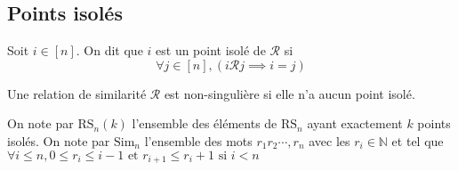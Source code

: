 
\subsection{Points isolés}
\begin{definition}
	\begin{rm}
		Soit $i \in [n]$. On dit que $i$ est un point isolé de $\mathcal{R}$ si \\
		$$\forall j \in [n], (i\mathcal{R} j\implies i=j) $$
	\end{rm}
\end{definition}
\begin{definition}
	\begin{rm}
		Une relation de similarité $\mathcal{R}$ est non-singulière si elle n'a aucun point
		isolé.
	\end{rm}
\end{definition}
On note par $\text{RS}_{n}(k)$ l'ensemble des éléments de $\text{RS}_{n}$ ayant exactement $k$ points isolés.
On note par $\text{Sim}_{n}$ l'ensemble des mots $r_{1} r_{2}\cdots, r_{n}$ avec les $r_{i}\in\mathbb{N}$ et tel que \\
$\forall i\leq n, 0\leq r_{i} \leq i-1 \text{ et }  r_{i+1}\leq r_{i}+1 \text{ si } i<n $
\newpage

